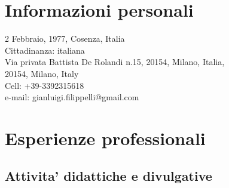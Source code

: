 \section{Informazioni personali}

\begin{flushleft}
	2 Febbraio, 1977, Cosenza, Italia\\
	Cittadinanza: italiana\\
	Via privata Battista De Rolandi n.15, 20154, Milano, Italia,\\
	20154, Milano, Italy\\ 
	Cell: +39-3392315618\\
	e-mail: gianluigi.filippelli@gmail.com\\
\end{flushleft}

\section{Esperienze professionali}
\subsection*{Attivita' didattiche e divulgative}

